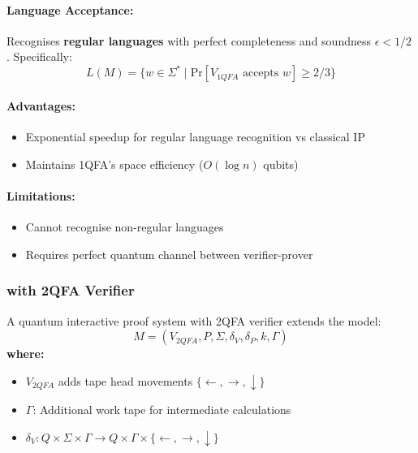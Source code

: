 \paragraph{Language Acceptance:}
Recognises \textbf{regular languages} with perfect completeness and soundness $\epsilon < 1/2$ \cite{yakaryilmaz2013verification}. Specifically:
\[
L(M) = \{w \in \Sigma^* \mid \text{Pr}[V_{1QFA} \text{ accepts } w] \geq 2/3\}
\]

\paragraph{Advantages:}
\begin{itemize}
    \item Exponential speedup for regular language recognition vs classical IP
    \item Maintains 1QFA's space efficiency ($O(\log n)$ qubits)
\end{itemize}

\paragraph{Limitations:}
\begin{itemize}
    \item Cannot recognise non-regular languages
    \item Requires perfect quantum channel between verifier-prover
\end{itemize}

\subsubsection{ with 2QFA Verifier}
\label{subsec:qip2qfa}

\begin{definition}
A quantum interactive proof system with 2QFA verifier extends the model:
\[
M = (V_{2QFA}, P, \Sigma, \delta_V, \delta_P, k, \Gamma)
\]
\textbf{where:}
\begin{itemize}
    \item $V_{2QFA}$ adds tape head movements $\{\leftarrow, \rightarrow, \downarrow\}$
    \item $\Gamma$: Additional work tape for intermediate calculations
    \item $\delta_V: Q \times \Sigma \times \Gamma \rightarrow Q \times \Gamma \times \{\leftarrow, \rightarrow, \downarrow\}$
\end{itemize}
\end{definition}

